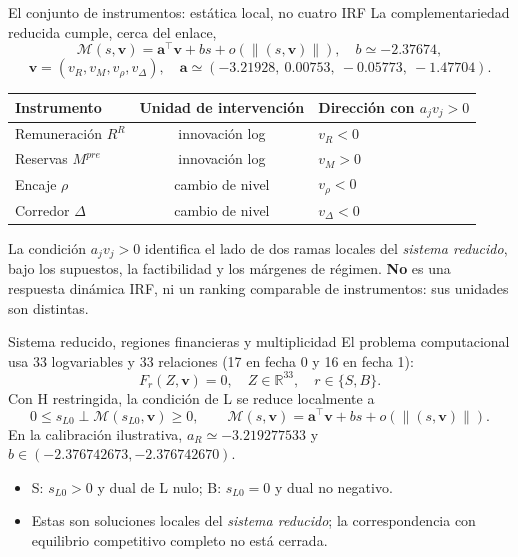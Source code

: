 \documentclass[aspectratio=169,11pt]{beamer}
\begin{document}
\begin{frame}{El conjunto de instrumentos: estática local, no cuatro IRF}
\small
La complementariedad reducida cumple, cerca del enlace,
\[
\mathcal M(s,\mathbf v)=\mathbf a^\top\mathbf v+bs+o(\|(s,\mathbf v)\|),
\quad b\simeq-2.37674,
\]
\[
\mathbf v=(v_R,v_M,v_\rho,v_\Delta),\quad
\mathbf a\simeq(-3.21928,\ 0.00753,\ -0.05773,\ -1.47704).
\]
\begin{center}
\small
\begin{tabular}{@{}lcl@{}}\toprule
Instrumento & Unidad de intervención & Dirección con $a_jv_j>0$\\\midrule
Remuneración $R^R$ & innovación log & $v_R<0$\\
Reservas $M^{pre}$ & innovación log & $v_M>0$\\
Encaje $\rho$ & cambio de nivel & $v_\rho<0$\\
Corredor $\Delta$ & cambio de nivel & $v_\Delta<0$\\
\bottomrule
\end{tabular}
\end{center}
\footnotesize
La condición $a_jv_j>0$ identifica el lado de dos ramas
locales del \emph{sistema reducido}, bajo los supuestos,
la factibilidad y los márgenes de régimen. \textbf{No} es
una respuesta dinámica IRF, ni un ranking comparable de
instrumentos: sus unidades son distintas.
\end{frame}

\begin{frame}{Sistema reducido, regiones financieras y multiplicidad}
\small
El problema computacional usa 33 logvariables y 33 relaciones
(17 en fecha 0 y 16 en fecha 1):
\[
F_r(Z,\mathbf v)=0,\quad Z\in\mathbb R^{33},\quad r\in\{S,B\}.
\]
Con H restringida, la condición de L se reduce localmente a
\[
0\leq s_{L0}\perp\mathcal M(s_{L0},\mathbf v)\geq0,\qquad
\mathcal M(s,\mathbf v)=\mathbf a^\top\mathbf v+bs
+o(\|(s,\mathbf v)\|).
\]
En la calibración ilustrativa, $a_R\simeq-3.219277533$ y
$b\in(-2.376742673,-2.376742670)$.
\begin{itemize}
\item S: $s_{L0}>0$ y dual de L nulo; B: $s_{L0}=0$ y dual no negativo.
\item Estas son soluciones locales del \emph{sistema reducido}; la
correspondencia con equilibrio competitivo completo no está cerrada.
\end{itemize}
\end{frame}
\end{document}

